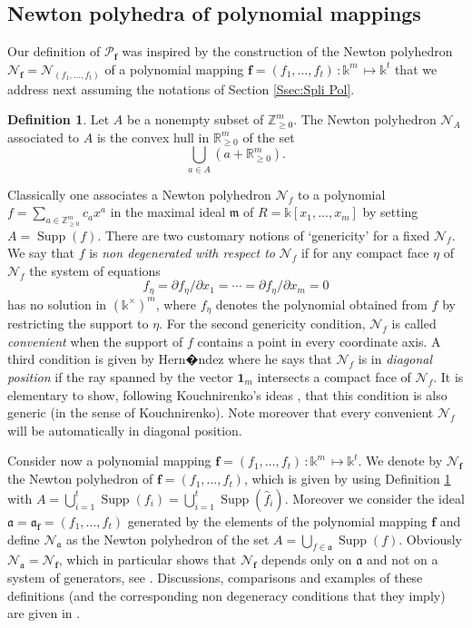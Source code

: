 \documentclass[12pt]{amsart}
\theoremstyle{definition}
\newtheorem{definition}[theorem]{Definition}
\numberwithin{equation}{subsection}
\newcommand{\m}{\mathfrak{m}}
\newcommand{\fa}{\mathfrak{a}}
\newcommand{\SP}{\mathcal{P}}
\newcommand{\N}{\mathcal{N}}
\newcommand{\Bf}{\boldsymbol{f}}
\newcommand{\Supp}{\operatorname{Supp}}
\renewcommand{\!}[1]{{\color{red}\text{\Huge$\star$ }#1}}
\begin{document}
\subsection{Newton polyhedra of polynomial mappings}\label{SSec:Newton}
Our definition of $\SP_{\Bf}$ was inspired by the construction of the Newton polyhedron $\N_{\Bf}=\N_{(f_1, \ldots, f_t)}$  of a polynomial  mapping $\boldsymbol{f}=(f_1,\ldots, f_t)\, :\mathbb{k}^m\,\mapsto \mathbb{k}^t$ that we address next assuming the notations of Section \ref{Ssec:Spli Pol}.  

\begin{definition} \label{defiNewton}
	Let $A$ be a nonempty subset of $\mathbb{Z}_{\geq 0}^{m}$. The Newton polyhedron 
	$\N_A$ associated to $A$ is the convex hull in
	$\mathbb{R}_{\geq 0}^{m}$ of the set 
	$$\bigcup_{a\in A}\left(  a+\mathbb{R}_{\geq 0}^{m}\right).$$ 
\end{definition}
Classically one associates a Newton	polyhedron $\N_f$ to a polynomial $f=\sum_{a\in\mathbb{Z}_{\geq 0}^m} c_ax^a$ in the maximal ideal $\m$ of $R=\mathbb{k}[x_1, \ldots, x_m]$ by setting $A=\Supp(f)$. There are two customary notions of `genericity' for a fixed $\N_{f}$. We say that $f$ is \textit{non degenerated with respect to} $\N_f$ if for any compact face $\eta$ of $\N_f$ the system of equations
\begin{equation}\label{Eq:Nondeg}
	f_\eta=\partial f_\eta/\partial x_1=\cdots=\partial f_\eta/\partial x_m=0
\end{equation}
has no solution in $(\mathbb{k}^\times)^m$, where $f_\eta$ denotes the polynomial obtained from $f$ by restricting the support to $\eta$. For the second genericity condition, $\N_f$ is called \textit{convenient} when the support of $f$ contains a point in every coordinate axis. A third condition is given by Hern�ndez \cite[Definition 29]{HDpolynomials} where he says that $\N_f$ is in \textit{diagonal position} if the ray spanned by the vector $\boldsymbol{1}_m$ intersects a compact face of $\N_f$. It is elementary to show, following Kouchnirenko's ideas \cite{Kou}, that this condition is also generic (in the sense of Kouchnirenko). Note moreover that every convenient $\N_f$ will be automatically in diagonal position. 

Consider now a polynomial  mapping  $\boldsymbol{f}=(f_1,\ldots, f_t)\, :\mathbb{k}^m\,\mapsto \mathbb{k}^t$. We denote by $\N_{\Bf}$ the Newton polyhedron of $\boldsymbol{f}=(f_1,\ldots, f_t)$, which is given by using Definition \ref{defiNewton} with  $A=\bigcup_{i=1}^t\Supp(f_i)=\bigcup_{i=1}^t\Supp(\hat{f}_i)$. Moreover we consider the ideal $\fa=\fa_{\boldsymbol{f}}=(f_1,\ldots, f_t)$ generated by the elements of the polynomial mapping $\Bf$ and define $\N_{\fa}$ as the Newton polyhedron of the set $A=\bigcup_{f\in\fa}\Supp(f)$. Obviously $\N_{\fa}=\N_{\Bf}$, which in particular shows that $\N_{\Bf}$ depends only on $\fa$ and not on a system of generators, see \cite[Section 2.1]{CNV15}. Discussions, comparisons and examples of these definitions (and the corresponding non degeneracy conditions that they imply) are given in \cite{BiFuSa,Tei,VeZu,LeVeZu,Ros,Ste}.
\end{document}
